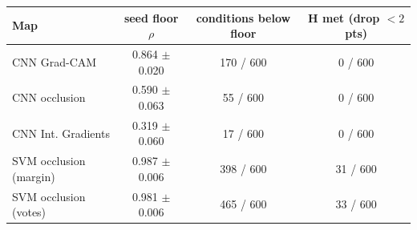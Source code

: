 \begin{tabular}{@{}lccc@{}}\toprule
Map & seed floor $\rho$ & conditions below floor & H met (drop $<2$ pts)\\\midrule
CNN Grad-CAM & 0.864 $\pm$ 0.020 & 170 / 600 & 0 / 600 \\
CNN occlusion & 0.590 $\pm$ 0.063 & 55 / 600 & 0 / 600 \\
CNN Int. Gradients & 0.319 $\pm$ 0.060 & 17 / 600 & 0 / 600 \\
SVM occlusion (margin) & 0.987 $\pm$ 0.006 & 398 / 600 & 31 / 600 \\
SVM occlusion (votes) & 0.981 $\pm$ 0.006 & 465 / 600 & 33 / 600 \\
\bottomrule\end{tabular}
